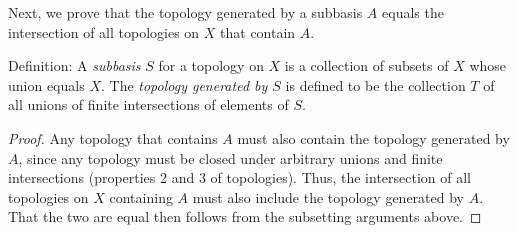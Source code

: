 \documentclass[11pt]{article}
\begin{document}
Next, we prove that the topology generated by a subbasis \(A\) equals
the intersection of all topologies on \(X\) that contain \(A\). 

Definition: A \textit{subbasis} \(S\) for a topology on \(X\) is a
collection of subsets of \(X\) whose union equals \(X\). The
\textit{topology generated by $S$} is defined to be the collection \(T\)
of all unions of finite intersections of elements of \(S\).

\begin{proof}


Any topology that contains \(A\) must also contain the topology
generated by \(A\), since any topology must be closed under arbitrary
unions and finite intersections (properties 2 and 3 of
topologies). Thus, the intersection of all topologies on \(X\)
containing \(A\) must also include the topology generated by \(A\). That
the two are equal then follows from the subsetting arguments above.
\end{proof}
\end{document}
